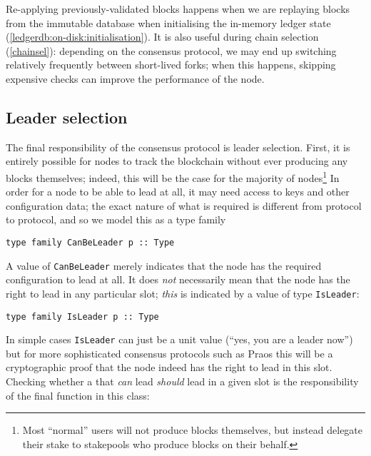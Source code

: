 Re-applying previously-validated blocks happens when we are replaying blocks
from the immutable database when initialising the in-memory ledger state
(\cref{ledgerdb:on-disk:initialisation}). It is also useful during chain
selection (\cref{chainsel}): depending on the consensus protocol, we may end up
switching relatively frequently between short-lived forks; when this happens,
skipping expensive checks can improve the performance of the node. 

\subsection{Leader selection}
\label{consensus:class:leaderselection}

The final responsibility of the consensus protocol is leader selection. First,
it is entirely possible for nodes to track the blockchain without ever producing
any blocks themselves; indeed, this will be the case for the majority of
nodes\footnote{Most ``normal'' users will not produce blocks themselves, but
instead delegate their stake to stakepools who produce blocks on their behalf.}
In order for a node to be able to lead at all, it may need access to keys and
other configuration data; the exact nature of what is required is different
from protocol to protocol, and so we model this as a type family

\begin{lstlisting}
type family CanBeLeader p :: Type
\end{lstlisting}

A value of \lstinline!CanBeLeader! merely indicates that the node has the
required configuration to lead at all. It does \emph{not} necessarily mean that
the node has the right to lead in any particular slot; \emph{this} is indicated
by a value of type \lstinline!IsLeader!:

\begin{lstlisting}
type family IsLeader p :: Type
\end{lstlisting}

In simple cases \lstinline!IsLeader! can just be a unit value (``yes, you are a
leader now'') but for more sophisticated consensus protocols such as Praos this
will be a cryptographic proof that the node indeed has the right to lead in this
slot. Checking whether a that \emph{can} lead \emph{should} lead in a given slot
is the responsibility of the final function in this class:

